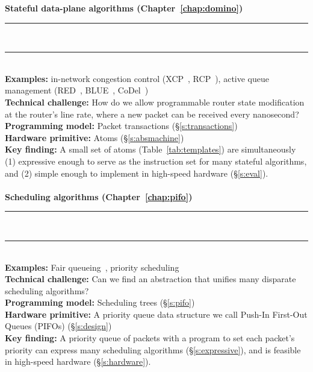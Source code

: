 \begin{table}
\textbf{Stateful data-plane algorithms (Chapter~\ref{chap:domino})}
\\[-7pt]\rule{\textwidth}{1pt}\\[-7pt]\rule{\textwidth}{1pt} \\
\textbf{Examples:} in-network congestion control (XCP~\cite{xcp}, RCP~\cite{rcp}), active
queue management (RED~\cite{red}, BLUE~\cite{blue}, CoDel~\cite{codel}) \\
\textbf{Technical challenge:} How do we allow programmable router state modification at
the router's line rate, where a new packet can be received every nanosecond? \\
\textbf{Programming model:} Packet transactions (\S\ref{s:transactions})\\
\textbf{Hardware primitive:} Atoms (\S\ref{s:absmachine}) \\
\textbf{Key finding:} A small set of atoms (Table~\ref{tab:templates}) are simultaneously (1) expressive enough to
serve as the instruction set for many stateful algorithms, and (2) simple
enough to implement in high-speed hardware (\S\ref{s:eval}). \\ \\

\textbf{Scheduling algorithms (Chapter~\ref{chap:pifo})}
\\[-7pt]\rule{\textwidth}{1pt}\\[-7pt]\rule{\textwidth}{1pt} \\
\textbf{Examples:} Fair queueing~\cite{wfq}, priority scheduling~\cite{srpt} \\
\textbf{Technical challenge:} Can we find an abstraction that unifies many disparate
scheduling algorithms? \\
\textbf{Programming model:} Scheduling trees (\S\ref{s:pifo}) \\
\textbf{Hardware primitive:} A priority queue data structure we call Push-In First-Out
Queues (PIFOs) (\S\ref{s:design}) \\
\textbf{Key finding:} A priority queue of packets with a program to set each packet's
priority can express many scheduling algorithms (\S\ref{s:expressive}), and is feasible in high-speed
hardware (\S\ref{s:hardware}). \\\\


\end{table}
